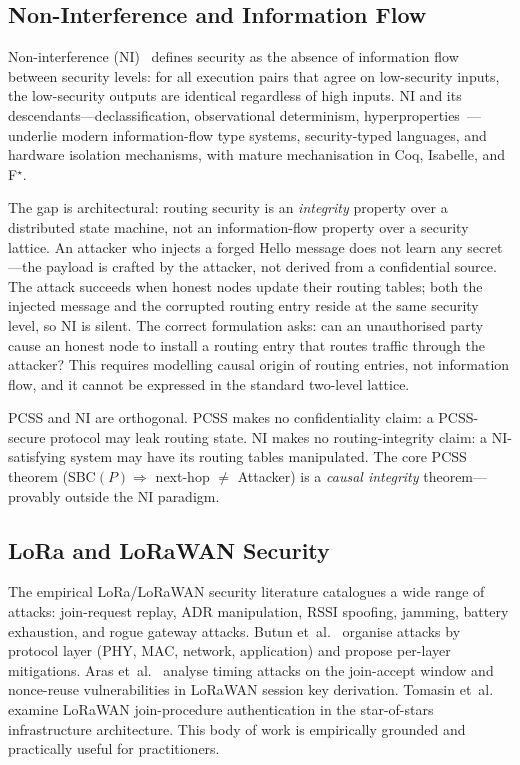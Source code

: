 \documentclass[journal,compsoc]{IEEEtran}
\theoremstyle{plain}
\theoremstyle{definition}
\theoremstyle{remark}
\begin{document}
\subsection{Non-Interference and Information Flow}

Non-interference (NI)~\cite{goguen1982security} defines security as the
absence of information flow between security levels: for all execution pairs
that agree on low-security inputs, the low-security outputs are identical
regardless of high inputs.  NI and its descendants---declassification,
observational determinism, hyperproperties~\cite{clarkson2010hyperproperties}---underlie
modern information-flow type systems, security-typed languages, and hardware
isolation mechanisms, with mature mechanisation in Coq, Isabelle, and F$^\star$.

The gap is architectural: routing security is an \emph{integrity} property
over a distributed state machine, not an information-flow property over a
security lattice.  An attacker who injects a forged Hello message does not
learn any secret---the payload is crafted by the attacker, not derived from
a confidential source.  The attack succeeds when honest nodes update their
routing tables; both the injected message and the corrupted routing entry
reside at the same security level, so NI is silent.  The correct formulation
asks: can an unauthorised party cause an honest node to install a routing
entry that routes traffic through the attacker?  This requires modelling
causal origin of routing entries, not information flow, and it cannot be
expressed in the standard two-level lattice.

PCSS and NI are orthogonal.  PCSS makes no confidentiality claim: a
PCSS-secure protocol may leak routing state.  NI makes no routing-integrity
claim: a NI-satisfying system may have its routing tables manipulated.  The
core PCSS theorem (SBC$(P) \Rightarrow$ next-hop $\neq$ Attacker) is a
\emph{causal integrity} theorem---provably outside the NI paradigm.

\subsection{LoRa and LoRaWAN Security}

The empirical LoRa/LoRaWAN security literature catalogues a wide range of
attacks: join-request replay, ADR manipulation, RSSI spoofing, jamming,
battery exhaustion, and rogue gateway attacks.  Butun
et~al.~\cite{butun2019security} organise attacks by protocol layer (PHY,
MAC, network, application) and propose per-layer mitigations.
Aras et~al.~\cite{aras2017exploring} analyse timing attacks on the
join-accept window and nonce-reuse vulnerabilities in LoRaWAN session key
derivation.  Tomasin et~al.~\cite{tomasin2017security} examine LoRaWAN
join-procedure authentication in the star-of-stars infrastructure
architecture.  This body of work is empirically grounded and practically
useful for practitioners.
\end{document}
